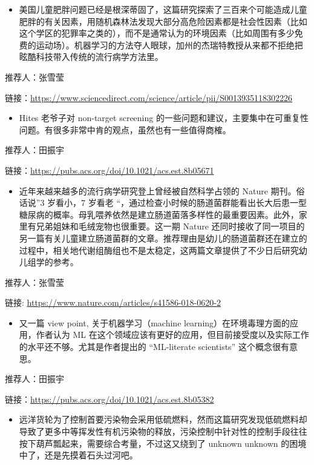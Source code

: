 \documentclass[]{book}
\providecommand{\tightlist}{%
  \setlength{\itemsep}{0pt}\setlength{\parskip}{0pt}}
\begin{document}
\begin{itemize}
\tightlist
\item
  美国儿童肥胖问题已经是根深蒂固了，这篇研究探索了三百来个可能造成儿童肥胖的有关因素，用随机森林法发现大部分高危险因素都是社会性因素（比如这个学区的犯罪率之类的），而不是通常认为的环境因素（比如周围有多少免费的运动场）。机器学习的方法夺人眼球，加州的杰瑞特教授从来都不拒绝把眩酷科技带入传统的流行病学方法里。
\end{itemize}

推荐人：张雪莹

链接：\url{https://www.sciencedirect.com/science/article/pii/S0013935118302226}

\begin{itemize}
\tightlist
\item
  Hites 老爷子对 non-target screening 的一些问题和建议，主要集中在可重复性问题。有很多非常中肯的观点，虽然也有一些值得商榷。
\end{itemize}

推荐人：田振宇

链接：\url{https://pubs.acs.org/doi/10.1021/acs.est.8b05671}

\begin{itemize}
\tightlist
\item
  近年来越来越多的流行病学研究登上曾经被自然科学占领的 Nature 期刊。俗话说''3 岁看小，7 岁看老 ``，通过检查小时候的肠道菌群能看出长大后患一型糖尿病的概率。母乳喂养依然是建立肠道菌落多样性的最重要因素。此外，家里有兄弟姐妹和毛绒宠物也很重要。这一期 Nature 还同时接收了同一项目的另一篇有关儿童建立肠道菌群的文章。推荐理由是幼儿的肠道菌群还在建立的过程中，相关地代谢组酶组也不是太稳定，这两篇文章提供了不少日后研究幼儿组学的参考。
\end{itemize}

推荐人：张雪莹

链接: \url{https://www.nature.com/articles/s41586-018-0620-2}

\begin{itemize}
\tightlist
\item
  又一篇 view point, 关于机器学习（machine learning）在环境毒理方面的应用，作者认为 ML 在这个领域应该有更好的应用，但目前接受度以及实际工作的水平还不够。尤其是作者提出的 ``ML-literate scientists'' 这个概念很有意思。
\end{itemize}

推荐人：田振宇

链接：\url{https://pubs.acs.org/doi/10.1021/acs.est.8b05382}

\begin{itemize}
\tightlist
\item
  远洋货轮为了控制首要污染物会采用低硫燃料，然而这篇研究发现低硫燃料却导致了更多中等挥发性有机污染物的释放，污染控制中针对性的控制手段往往按下葫芦瓢起来，需要综合考量，不过这又绕到了 unknown unknown 的困境中了，还是先摸着石头过河吧。
\end{itemize}
\end{document}
